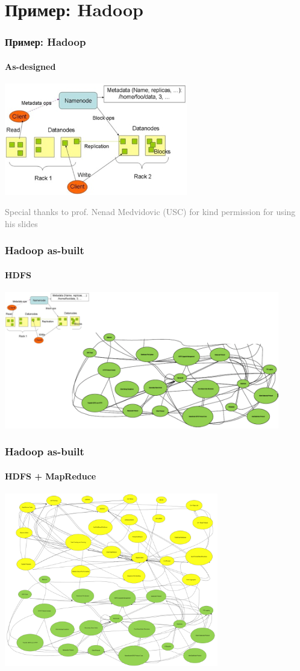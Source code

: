 \documentclass[xetex,mathserif,serif]{beamer}
\newcommand{\attribution}[1] {
	\begin{flushright}\begin{scriptsize}\textcolor{gray}{#1}\end{scriptsize}\end{flushright}
}
\begin{document}
	\section{Пример: Hadoop}

	\begin{frame}
		\frametitle{Пример: Hadoop}
		\framesubtitle{As-designed}
		\begin{center}
			\includegraphics[width=0.6\textwidth]{hadoopPrescriptive.png}
		\end{center}
		\attribution{Special thanks to prof. Nenad Medvidovic (USC) for kind permission for using his slides}
	\end{frame}

	\begin{frame}
		\frametitle{Hadoop as-built}
		\framesubtitle{HDFS}
		\begin{center}
			\includegraphics[width=0.9\textwidth]{hadoopDescriptive.png}
		\end{center}
	\end{frame}

	\begin{frame}
		\frametitle{Hadoop as-built}
		\framesubtitle{HDFS + MapReduce}
		\begin{center}
			\includegraphics[width=0.7\textwidth]{hdfsMapReduce.png}
		\end{center}
	\end{frame}
\end{document}
